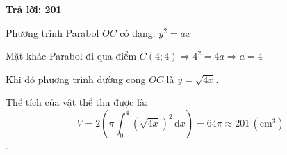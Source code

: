 \noindent \textbf{Trả lời: 201}

\noindent Phương trình Parabol $OC$ có dạng: $y^2 = ax$

\noindent Mặt khác Parabol đi qua điểm $C(4; 4) \Rightarrow 4^2 = 4a \Rightarrow a = 4$

\noindent Khi đó phương trình đường cong $OC$ là $y = \sqrt{4x}$.

\noindent Thể tích của vật thể thu được là: 
$$V = 2\left(\pi \int_{0}^{4} (\sqrt{4x})^2 \,\mathrm{d}x\right) = 64\pi \approx 201\,(\text{cm}^3)$$.
